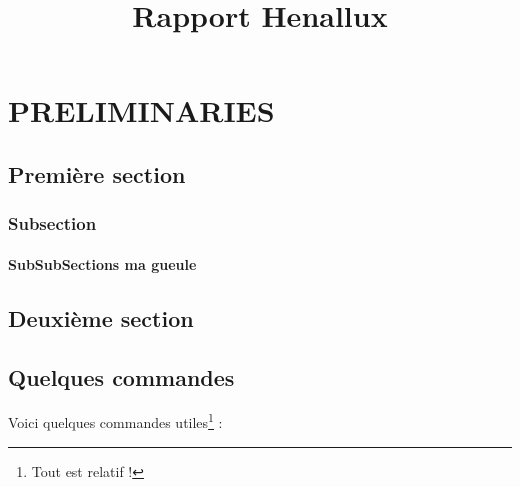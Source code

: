 \documentclass{rapportHenallux}
\title{Rapport Henallux} %
\begin{document}



        
\fairemarges %
\fairepagedegarde %
\tabledematieres %

\setcounter{page}{1}
\chapter{PRELIMINARIES}
\section{Première section} 

\lipsum[3-4]%

\subsection{Subsection}

\subsubsection{SubSubSections ma gueule}

\lipsum[3-4] %

\section{Deuxième section}

\lipsum[3-5] %


\section{Quelques commandes}

Voici quelques commandes utiles\footnote{Tout est relatif !} :
\end{document}
